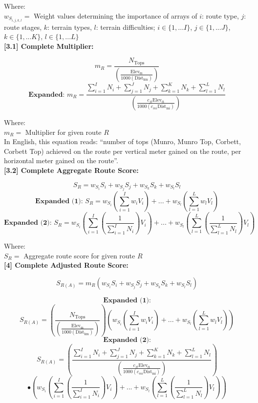 \documentclass[11pt, english]{article}
\begin{document}
	Where:\\
	$w_{S_{i,j,k,l}}=$ Weight values determining the importance of arrays of $i$: route type, $j$: route stages, $k$: terrain types, $l$: terrain difficulties; $i\in\{1,...I\}$, $j\in\{1,...J\}$, $k\in\{1,...K\}$, $l\in\{1,...L\}$\\

	\textbf{[3.1] Complete Multiplier:}

	$$m_{R}=\frac{N_{\mathrm{Tops}}}{\left(\frac{\mathrm{Elev_{m}}}{1000\left(\mathrm{Dist_{km}}\right)}\right)}$$
	$$\textbf{Expanded: }m_{R}=\frac{\sum^{I}_{i=1}N_{i}+\sum^{J}_{j=1}N_{j}+\sum^{K}_{k=1}N_{k}+\sum^{L}_{l=1}N_{l}}{\left(\frac{c_{ft}\mathrm{Elev_{ft}}}{1000\left(c_{mi}\mathrm{Dist_{mi}}\right)}\right)}$$

	Where:\\
	$m_{R}=$ Multiplier for given route $R$\\

	In English, this equation reads: ``number of tops (Munro, Munro Top, Corbett, Corbett Top) achieved on the route per vertical meter gained on the route, per horizontal meter gained on the route''.\\

	\textbf{[3.2] Complete Aggregate Route Score:}

	$$S_{R}=w_{S_{i}}S_{i}+w_{S_{j}}S_{j}+w_{S_{k}}S_{k}+w_{S_{l}}S_{l}$$
	$$\textbf{Expanded (1): }S_{R}=w_{S_{i}}\left(\sum^{I}_{i=1} w_{i}V_{i}\right)+...+w_{S_{l}}\left(\sum^{L}_{l=1} w_{l}V_{l}\right)$$
	$$\textbf{Expanded (2): }S_{R}=w_{S_{i}}\left(\sum^{I}_{i=1} \left(\frac{1}{\sum^{I}_{i=1}N_{i}}\right)V_{i}\right)+...+w_{S_{l}}\left(\sum^{L}_{l=1} \left(\frac{1}{\sum^{L}_{l=1}N_{l}}\right)V_{l}\right)$$

	Where:\\
	$S_{R}=$ Aggregate route score for given route $R$\\

	\textbf{[4] Complete Adjusted Route Score:}

	$$S_{R(A)}=m_{R}\left(w_{S_{i}}S_{i}+w_{S_{j}}S_{j}+w_{S_{k}}S_{k}+w_{S_{l}}S_{l}\right)$$

	$$\textbf{Expanded (1):}$$
	$$S_{R(A)}=\left(\frac{N_{\mathrm{Tops}}}{\left(\frac{\mathrm{Elev_{m}}}{1000\left(\mathrm{Dist_{km}}\right)}\right)}\right)\left(w_{S_{i}}\left(\sum^{I}_{i=1} w_{i}V_{i}\right)+...+w_{S_{l}}\left(\sum^{L}_{l=1} w_{l}V_{l}\right)\right)$$
	$$\textbf{Expanded (2):}$$
	$$S_{R(A)}=\left(\frac{\sum^{I}_{i=1}N_{i}+\sum^{J}_{j=1}N_{j}+\sum^{K}_{k=1}N_{k}+\sum^{L}_{l=1}N_{l}}{\left(\frac{c_{ft}\mathrm{Elev_{ft}}}{1000\left(c_{mi}\mathrm{Dist_{mi}}\right)}\right)}\right)$$
	$$\bullet\left(w_{S_{i}}\left(\sum^{I}_{i=1} \left(\frac{1}{\sum^{I}_{i=1}N_{i}}\right)V_{i}\right)+...+w_{S_{l}}\left(\sum^{L}_{l=1} \left(\frac{1}{\sum^{L}_{l=1}N_{l}}\right)V_{l}\right)\right)$$
\end{document}
